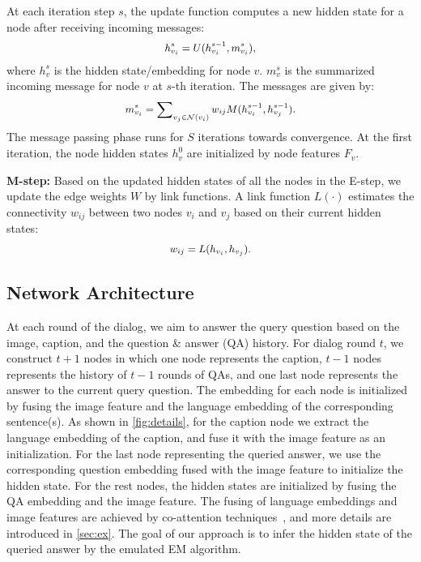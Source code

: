 \documentclass[10pt,twocolumn,letterpaper]{article}
\begin{document}
At each iteration step $s$, the update function computes a new hidden state for a node after receiving incoming messages:\begin{equation}\small
\begin{aligned}
h_{v_{i}}^{s} = U(h_{v_{i}}^{s-1}, m_{v_{i}}^{s}),
\end{aligned}
\label{eqn:update_function}
\end{equation}
where $h_{v}^{s}$ is the hidden state/embedding for node $v$. $m_{v}^{s}$ is the summarized incoming message for node $v$ at $s$-th iteration. The messages are given by:
\vspace*{-3pt}
\begin{equation}\small
\begin{aligned}
m_{v_{i}}^{s} = \sum\nolimits_{v_{j} \in \mathcal{N}(v_{i})} w_{ij} M(h_{v_{i}}^{s-1}, h_{v_{j}}^{s-1}).
\end{aligned}
\label{eqn:message_function}
\end{equation}
The message passing phase runs for $S$ iterations towards convergence. At the first iteration, the node hidden states $h_{v}^{0}$ are initialized by node features $F_{v}$.


\noindent\textbf{M-step:} Based on the updated hidden states of all the nodes in the E-step, we update the edge weights $W$ by link functions. A link function $L(\cdot)$ estimates the connectivity $w_{ij}$ between two nodes $v_i$ and $v_j$ based on their current hidden states:
\begin{equation}\small
\begin{aligned}
w_{ij} = L(h_{v_i}, h_{v_j}).
\end{aligned}
\label{eqn:link_function}
\end{equation}






\subsection{Network Architecture}
\label{sec:arch}
At each round of the dialog, we aim to answer the query question based on the image, caption, and the question \& answer (QA) history.
For dialog round $t$, we construct $t\!+\!1$ nodes in which one node represents the caption, $t\!-\!1$ nodes represents the history of $t\!-\!1$ rounds of QAs, and one last node represents the answer to the current query question. The embedding for each node is initialized by fusing the image feature and the language embedding of the corresponding sentence(s). As shown in \autoref{fig:details}, for the caption node we extract the language embedding of the caption, and fuse it with the image feature as an initialization. For the last node representing the queried answer, we use the corresponding question embedding fused with the image feature to initialize the hidden state. For the rest nodes, the hidden states are initialized by fusing the QA embedding and the image feature. The fusing of language embeddings and image features are achieved by co-attention techniques~\cite{lu2016hierarchical}, and more details are introduced in \autoref{sec:ex}. The goal of our approach is to infer the hidden state of the queried answer by the emulated EM algorithm.
\end{document}
